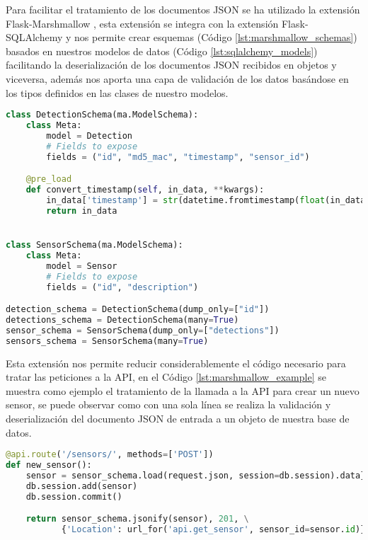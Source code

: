 \documentclass[../proyecto.tex]{subfiles}
\begin{document}
Para facilitar el tratamiento de los documentos JSON se ha utilizado la extensión Flask-Marshmallow \cite{flask_marshmallow}, esta extensión se integra con la extensión Flask-SQLAlchemy y nos permite crear esquemas (Código \ref{lst:marshmallow_schemas}) basados en nuestros modelos de datos (Código \ref{lst:sqlalchemy_models}) facilitando la deserialización de los documentos JSON recibidos en objetos y viceversa, además nos aporta una capa de validación de los datos basándose en los tipos definidos en las clases de nuestro modelos.\\

\begin{minipage}{\linewidth}
\begin{lstlisting}[language=Python, caption=Esquemas de datos de Flask-Marshmallow, label={lst:marshmallow_schemas},captionpos=b, frame=single]
class DetectionSchema(ma.ModelSchema):
    class Meta:
        model = Detection
        # Fields to expose
        fields = ("id", "md5_mac", "timestamp", "sensor_id")

    @pre_load
    def convert_timestamp(self, in_data, **kwargs):
        in_data['timestamp'] = str(datetime.fromtimestamp(float(in_data['timestamp'])))
        return in_data


class SensorSchema(ma.ModelSchema):
    class Meta:
        model = Sensor
        # Fields to expose
        fields = ("id", "description")

detection_schema = DetectionSchema(dump_only=["id"])
detections_schema = DetectionSchema(many=True)
sensor_schema = SensorSchema(dump_only=["detections"])
sensors_schema = SensorSchema(many=True)
\end{lstlisting}
\end{minipage}

Esta extensión nos permite reducir considerablemente el código necesario para tratar las peticiones a la API, en el Código \ref{lst:marshmallow_example} se muestra como ejemplo el tratamiento de la llamada a la API para crear un nuevo sensor, se puede observar como con una sola línea se realiza la validación y deserialización del documento JSON de entrada a un objeto de nuestra base de datos.

\begin{lstlisting}[language=Python, caption=Ejemplo de funcionamiento de Flask-Marshmallow, label={lst:marshmallow_example},captionpos=b, frame=single]
@api.route('/sensors/', methods=['POST'])
def new_sensor():
    sensor = sensor_schema.load(request.json, session=db.session).data}
    db.session.add(sensor)
    db.session.commit()

    return sensor_schema.jsonify(sensor), 201, \
           {'Location': url_for('api.get_sensor', sensor_id=sensor.id)}
\end{lstlisting}
\end{document}
